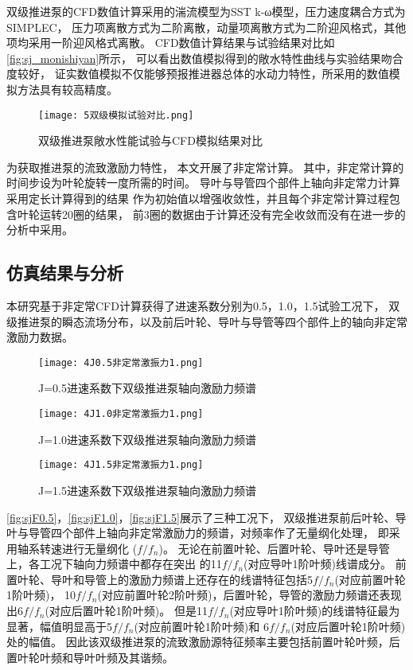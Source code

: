 双级推进泵的CFD数值计算采用的湍流模型为SST k-ω模型，压力速度耦合方式为SIMPLEC，
压力项离散方式为二阶离散，动量项离散方式为二阶迎风格式，其他项均采用一阶迎风格式离散。
CFD数值计算结果与试验结果对比如\autoref{fig:sj_monishiyan}所示，
可以看出数值模拟得到的敞水特性曲线与实验结果吻合度较好，
证实数值模拟不仅能够预报推进器总体的水动力特性，所采用的数值模拟方法具有较高精度。
\begin{figure}[htbp]
    \centering
    \texttt{[image: 5双级模拟试验对比.png]}
    \caption{\label{fig:sj_monishiyan}双级推进泵敞水性能试验与CFD模拟结果对比}
\end{figure}

为获取推进泵的流致激励力特性，
本文开展了非定常计算。
其中，非定常计算的时间步设为叶轮旋转一度所需的时间。
导叶与导管四个部件上轴向非定常力计算采用定长计算得到的结果
作为初始值以增强收敛性，并且每个非定常计算过程包含叶轮运转20圈的结果，
前3圈的数据由于计算还没有完全收敛而没有在进一步的分析中采用。
\subsection{仿真结果与分析}
本研究基于非定常CFD计算获得了进速系数分别为0.5，1.0，1.5试验工况下，
双级推进泵的瞬态流场分布，以及前后叶轮、导叶与导管等四个部件上的轴向非定常激励力数据。
\begin{figure}[htbp]
    \centering
    \texttt{[image: 4J0.5非定常激振力1.png]}
    \caption{\label{fig:sjF0.5}J=0.5进速系数下双级推进泵轴向激励力频谱}
\end{figure}
\begin{figure}[htbp]
    \centering
    \texttt{[image: 4J1.0非定常激振力1.png]}
    \caption{\label{fig:sjF1.0}J=1.0进速系数下双级推进泵轴向激励力频谱}
\end{figure}
\begin{figure}[htbp]
    \centering
    \texttt{[image: 4J1.5非定常激振力1.png]}
    \caption{\label{fig:sjF1.5}J=1.5进速系数下双级推进泵轴向激励力频谱}
\end{figure}

\autoref{fig:sjF0.5}，\autoref{fig:sjF1.0}，\autoref{fig:sjF1.5}展示了三种工况下，
双级推进泵前后叶轮、导叶与导管四个部件上轴向非定常激励力的频谱，对频率作了无量纲化处理，
即采用轴系转速进行无量纲化 ($f/f_n$)。
无论在前置叶轮、后置叶轮、导叶还是导管上，各工况下轴向力频谱中都存在突出
的11$f/f_n$(对应导叶1阶叶频)线谱成分。
前置叶轮、导叶和导管上的激励力频谱上还存在的线谱特征包括5$f/f_n$(对应前置叶轮1阶叶频)，
10$f/f_n$(对应前置叶轮2阶叶频)，后置叶轮，导管的激励力频谱还表现出6$f/f_n$(对应后置叶轮1阶叶频)。
但是11$f/f_n$(对应导叶1阶叶频)的线谱特征最为显著，幅值明显高于5$f/f_n$(对应前置叶轮1阶叶频)和
6$f/f_n$(对应后置叶轮1阶叶频)处的幅值。
因此该双级推进泵的流致激励源特征频率主要包括前置叶轮叶频，后置叶轮叶频和导叶叶频及其谐频。

